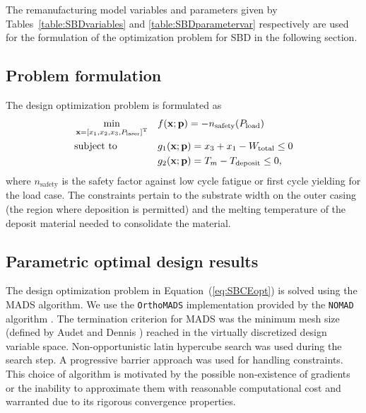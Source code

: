 The remanufacturing model variables and parameters given by Tables~\ref{table:SBDvariables} and \ref{table:SBDparametervar} respectively are used for the formulation of the optimization problem for \ac{SBD} in the following section. 

\subsection{Problem formulation} \label{subsec:SBDproblemformulation}

The design optimization problem is formulated as 
\begin{equation}
	\label{eq:SBCEopt}
	\begin{aligned}
		& \min_{\mathbf{x} = \left[x_1,x_2,x_3,P_{\textrm{laser}}\right]^{\text T}}
		& & f(\mathbf{x};\mathbf{p}) = -n_{\textrm{safety}}(P_{\textrm{load}})\\
		& \text{subject to}
		& & g_1(\mathbf{x};\mathbf{p}) = x_3 + x_1 - W_{\textrm{total}} \le 0\\
		& & & g_2(\mathbf{x};\mathbf{p}) = T_m - T_\textrm{deposit} \le 0,
	\end{aligned}
\end{equation}
where $n_{\textrm{safety}}$ is the safety factor against low cycle fatigue or first cycle yielding for the load case. The constraints pertain to the substrate width on the outer casing (the region where deposition is permitted) and the melting temperature of the deposit material needed to consolidate the material.

\subsection{Parametric optimal design results} \label{subsec:reduceddesignspace}

The design optimization problem in Equation~(\ref{eq:SBCEopt}) is solved using the \ac{MADS} algorithm. We use the \texttt{OrthoMADS} implementation provided by the \texttt{NOMAD} algorithm \cite{LeDigabel2011}. The termination criterion for \ac{MADS} was the minimum mesh size (defined by Audet and Dennis \cite{Audet2006a}) reached in the virtually discretized design variable space. Non-opportunistic latin hypercube search was used during the search step. A progressive barrier approach was used for handling constraints. This choice of algorithm is motivated by the possible non-existence of gradients or the inability to approximate them with reasonable computational cost and warranted due to its rigorous convergence properties.

